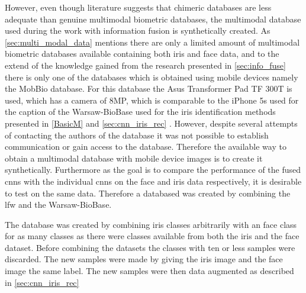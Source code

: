 However, even though literature suggests that chimeric databases are less adequate than genuine multimodal biometric databases, the multimodal database used during the work with information fusion is synthetically created. As \autoref{sec:multi_modal_data} mentions there are only a limited amount of multimodal biometric databases available containing both iris and face data, and to the extend of the knowledge gained from the research presented in \autoref{sec:info_fuse} there is only one of the databases which is obtained using mobile devices namely the MobBio database. For this database the Asus Transformer Pad TF 300T is used, which has a camera of 8MP, which is comparable to the iPhone 5s used for the caption of the Warsaw-BioBase used for the iris identification methods presented in \autoref{BasicM} and \autoref{sec:cnn_iris_rec} \citep{Sequeira2014}. However, despite several attempts of contacting the authors of the database it was not possible to establish communication or gain access to the database. Therefore the available way to obtain a multimodal database with mobile device images is to create it synthetically. Furthermore as the goal is to compare the performance of the fused \gls{cnn}s with the individual \gls{cnn}s on the face and iris data respectively, it is desirable to test on the same data. Therefore a databased was created by combining the \gls{lfw} and the Warsaw-BioBase. 

The database was created by combining iris classes arbitrarily with an face class for as many classes as there were classes available from both the iris and the face dataset. Before combining the datasets the classes with ten or less samples were discarded. The new samples were made by giving the iris image and the face image the same label. The new samples were then data augmented as described in \autoref{sec:cnn_iris_rec}

